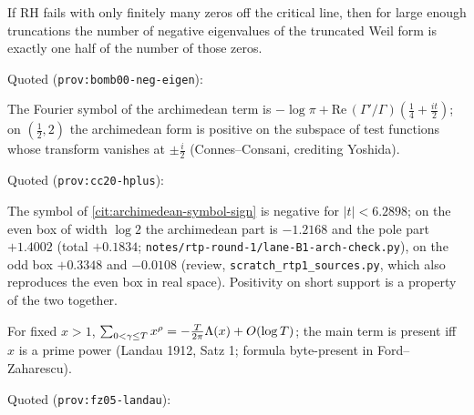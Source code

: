 \begin{citedfact}
\label{cit:bombieri-negative-eigenvalues}
If RH fails with only finitely many zeros off the critical line, then for large enough truncations the number
of negative eigenvalues of the truncated Weil form is exactly one half of the number of those zeros.

\par\noindent Quoted (\texttt{prov:bomb00-neg-eigen}):
{\small\texttt{}}
\end{citedfact}

\begin{citedfact}
\label{cit:archimedean-symbol-sign}
The Fourier symbol of the archimedean term is $-\log\pi+\mathrm{Re}\,(\Gamma'/\Gamma)(\tfrac14+\tfrac{it}2)$; on
$(\tfrac12,2)$ the archimedean form is positive on the subspace of test functions whose transform vanishes at
$\pm\tfrac i2$ (Connes--Consani, crediting Yoshida).

\par\noindent Quoted (\texttt{prov:cc20-hplus}):
{\small\texttt{}}
\end{citedfact}

\begin{numerical}
\label{num:archimedean-box}
The symbol of \cref{cit:archimedean-symbol-sign} is negative for $|t|<6.2898$; on the even box of width $\log2$
the archimedean part is $-1.2168$ and the pole part $+1.4002$ (total $+0.1834$;
\texttt{notes/rtp-round-1/lane-B1-arch-check.py}), on the odd box $+0.3348$ and $-0.0108$ (review,
\texttt{scratch\_rtp1\_sources.py}, which also reproduces the even box in real space).
Positivity on short support is a property of the two together.
\end{numerical}

\begin{citedfact}
\label{cit:landau-formula}
For fixed $x>1$, $\sum_{0<\gamma\le T}x^{\rho} = -\tfrac{T}{2\pi}\Lambda(x)+O(\log T)$; the main term is present
iff $x$ is a prime power (Landau 1912, Satz 1; formula byte-present in Ford--Zaharescu).

\par\noindent Quoted (\texttt{prov:fz05-landau}):
{\small\texttt{}}
\end{citedfact}

